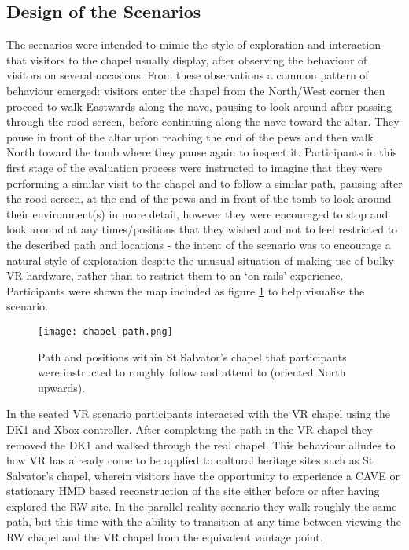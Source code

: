 
\subsection{Design of the Scenarios}

The scenarios were intended to mimic the style of exploration and interaction that visitors to the chapel usually display, after observing the behaviour of visitors on several occasions. From these observations a common pattern of behaviour emerged: visitors enter the chapel from the North/West corner then proceed to walk Eastwards along the nave, pausing to look around after passing through the rood screen, before continuing along the nave toward the altar. They pause in front of the altar upon reaching the end of the pews and then walk North toward the tomb where they pause again to inspect it. Participants in this first stage of the evaluation process were instructed to imagine that they were performing a similar visit to the chapel and to follow a similar path, pausing after the rood screen, at the end of the pews and in front of the tomb to look around their environment(s) in more detail, however they were encouraged to stop and look around at any times/positions that they wished and not to feel restricted to the described path and locations - the intent of the scenario was to encourage a natural style of exploration despite the unusual situation of making use of bulky VR hardware, rather than to restrict them to an `on rails' experience. Participants were shown the map included as figure \ref{chapel-path} to help visualise the scenario.

\begin{figure}
	\begin{center}
		\texttt{[image: chapel-path.png]}
		\caption{Path and positions within St Salvator's chapel that participants were instructed to roughly follow and attend to (oriented North upwards).}
		\label{chapel-path}
	\end{center}
\end{figure}

In the seated VR scenario participants interacted with the VR chapel using the DK1 and Xbox controller. After completing the path in the VR chapel they removed the DK1 and walked through the real chapel. This behaviour alludes to how VR has already come to be applied to cultural heritage sites such as St Salvator's chapel, wherein visitors have the opportunity to experience a CAVE or stationary HMD based reconstruction of the site either before or after having explored the RW site. In the parallel reality scenario they walk roughly the same path, but this time with the ability to transition at any time between viewing the RW chapel and the VR chapel from the equivalent vantage point.

